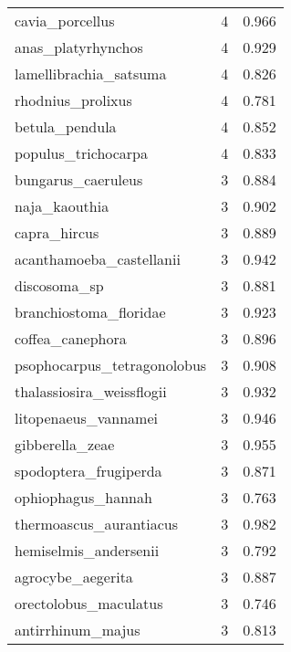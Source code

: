 \begin{tabular}{lrr}
                cavia\_porcellus &                   4 &     0.966 \\
             anas\_platyrhynchos &                   4 &     0.929 \\
         lamellibrachia\_satsuma &                   4 &     0.826 \\
              rhodnius\_prolixus &                   4 &     0.781 \\
                 betula\_pendula &                   4 &     0.852 \\
            populus\_trichocarpa &                   4 &     0.833 \\
             bungarus\_caeruleus &                   3 &     0.884 \\
                  naja\_kaouthia &                   3 &     0.902 \\
                   capra\_hircus &                   3 &     0.889 \\
       acanthamoeba\_castellanii &                   3 &     0.942 \\
                   discosoma\_sp &                   3 &     0.881 \\
         branchiostoma\_floridae &                   3 &     0.923 \\
               coffea\_canephora &                   3 &     0.896 \\
    psophocarpus\_tetragonolobus &                   3 &     0.908 \\
      thalassiosira\_weissflogii &                   3 &     0.932 \\
           litopenaeus\_vannamei &                   3 &     0.946 \\
                gibberella\_zeae &                   3 &     0.955 \\
          spodoptera\_frugiperda &                   3 &     0.871 \\
             ophiophagus\_hannah &                   3 &     0.763 \\
        thermoascus\_aurantiacus &                   3 &     0.982 \\
          hemiselmis\_andersenii &                   3 &     0.792 \\
              agrocybe\_aegerita &                   3 &     0.887 \\
          orectolobus\_maculatus &                   3 &     0.746 \\
              antirrhinum\_majus &                   3 &     0.813 \\

\end{tabular}
